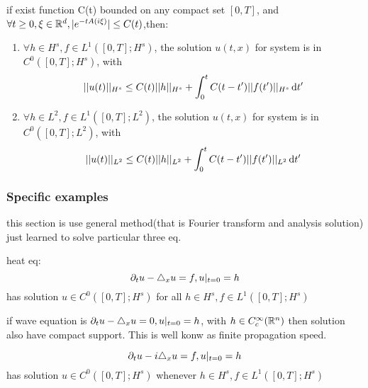 \documentclass[../main]{subfiles}
\begin{document}
\begin{thm}
    if exist function C(t) bounded on any compact set $[0,T]$, and $\forall t\ge 0,\xi\in \mathbb{R}^d, |e^{-t A(i\xi)}|\le C(t)$,then:
    \begin{enumerate}
        \item $\forall h\in H^s,f\in L^1([0,T];H^s)$, the solution $u(t,x)$ for system is in $C^0([0,T];H^s)$, with
        \begin{equation}
            ||u(t)||_{H^s}\le C(t)||h||_{H^s}+\int_0^t C(t-t')||f(t')||_{H^s}\,\mathrm{d}t'
        \end{equation}
        \item $\forall h\in L^2,f\in L^1([0,T];L^2)$, the solution $u(t,x)$ for system is in $C^0([0,T];L^2)$, with
        \begin{equation}
            ||u(t)||_{L^2}\le C(t)||h||_{L^2}+\int_0^t C(t-t')||f(t')||_{L^2}\,\mathrm{d}t'
        \end{equation}
    \end{enumerate}
\end{thm}
\newpage

\subsubsection{Specific examples}
this section is use general method(that is Fourier transform and analysis solution) just learned to solve particular three eq.
\begin{thm}
   heat eq:
    \begin{equation}
        \partial_t u -\triangle_x u=f, u|_{t=0}=h
    \end{equation}
    has solution $u\in C^0([0,T];H^s)$ for all $h\in H^s,f\in L^1([0,T];H^s)$
\end{thm}
\vspace{10cm}

\begin{thm}
    if wave equation is $\partial_t u-\triangle_x u=0, u|_{t=0}=h$, with $h\in C_c^\infty(\mathbb{R}^n)$ then solution also have compact support. This is well konw as finite propagation speed.
\end{thm}
\newpage 

\begin{thm}
    \begin{equation}
        \partial_t u -i\triangle_x u=f, u|_{t=0}=h
    \end{equation}
    has solution $u\in C^0([0,T];H^s)$ whenever $h\in H^s,f\in L^1([0,T];H^s)$
\end{thm}
\newpage
\end{document}

